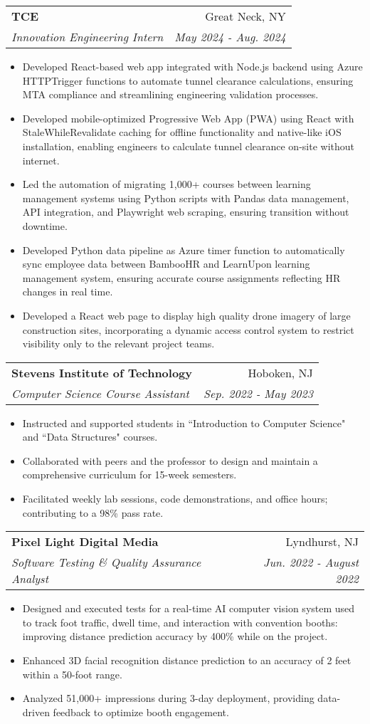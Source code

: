 \documentclass[letterpaper,11pt]{article}
\makeatletter
\newcommand{\resumeSubheading}[4]{
  \vspace{-1pt}\item
    \begin{tabular*}{0.97\textwidth}{l@{\extracolsep{\fill}}r}
      \textbf{#1} & #2 \\
      \textit{\small#3} & \textit{\small #4} \\
    \end{tabular*}\vspace{-5pt}
}
\newcommand{\resumeBullet}[1]{\item\small{#1}}
\newcommand{\resumeBulletStart}{ \begin{itemize}[leftmargin=*, itemsep=0pt, before={\linespread{0.9}\selectfont}] }
\newcommand{\resumeBulletEnd}{\end{itemize}}
\makeatother
\begin{document}
    \resumeSubheading
      {TCE}{Great Neck, NY}
      {Innovation Engineering Intern}{May 2024 - Aug. 2024}
      \resumeBulletStart
        \resumeBullet
        {Developed React-based web app integrated with Node.js backend using Azure HTTPTrigger functions to automate tunnel clearance calculations, ensuring MTA compliance and streamlining engineering validation processes.}
        \resumeBullet
        {Developed mobile-optimized Progressive Web App (PWA) using React with StaleWhileRevalidate caching for offline functionality and native-like iOS installation, enabling engineers to calculate tunnel clearance on-site without internet.}
        \resumeBullet
        {Led the automation of migrating 1,000+ courses between learning management systems using Python scripts with Pandas data management, API integration, and Playwright web scraping, ensuring transition without downtime.}
        \resumeBullet
        {Developed Python data pipeline as Azure timer function to automatically sync employee data between BambooHR and LearnUpon learning management system, ensuring accurate course assignments reflecting HR changes in real time.}
        \resumeBullet
        {Developed a React web page to display high quality drone imagery of large construction sites, incorporating a dynamic access control system to restrict visibility only to the relevant project teams.}
      \resumeBulletEnd

    \resumeSubheading
      {Stevens Institute of Technology}{Hoboken, NJ}
      {Computer Science Course Assistant}{Sep. 2022 - May 2023}
      \resumeBulletStart
        \resumeBullet
        {Instructed and supported students in ``Introduction to Computer Science" and ``Data Structures" courses.}
        \resumeBullet
        {Collaborated with peers and the professor to design and maintain a comprehensive curriculum for 15-week semesters.}
        \resumeBullet
        {Facilitated weekly lab sessions, code demonstrations, and office hours; contributing to a  98\% pass rate.}
      \resumeBulletEnd
  
    \resumeSubheading
      {Pixel Light Digital Media}{Lyndhurst, NJ}
      {Software Testing \& Quality Assurance Analyst}{Jun. 2022 - August 2022}
      \resumeBulletStart
        \resumeBullet
        {Designed and executed tests for a real-time AI computer vision system used to track foot traffic, dwell time, and interaction with convention booths: improving distance prediction accuracy by 400\% while on the project.}
        \resumeBullet 
        {Enhanced 3D facial recognition distance prediction to an accuracy of 2 feet within a 50-foot range.}
        \resumeBullet 
        {Analyzed 51,000+ impressions during 3-day deployment, providing data-driven feedback to optimize booth engagement.}
      \resumeBulletEnd
\end{document}
